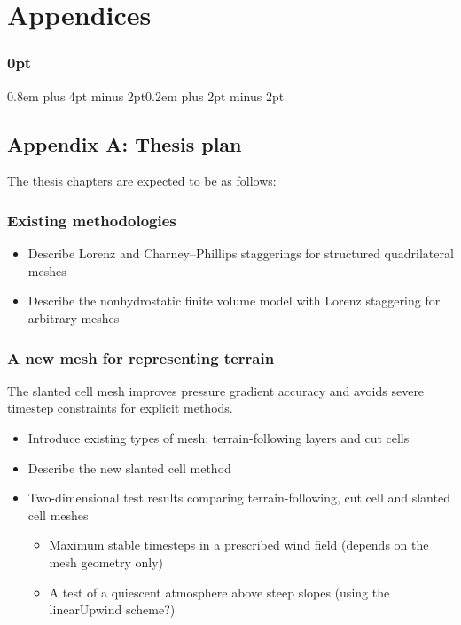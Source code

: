 \documentclass[a4paper,11pt]{article}
\begin{document}
                                                 


\newpage

\section*{Appendices}

\titlespacing\subsubsection{0pt}{0.8em plus 4pt minus 2pt}{0.2em plus 2pt minus 2pt}

\subsection*{Appendix A: Thesis plan}
The thesis chapters are expected to be as follows:

\subsubsection*{Existing methodologies}
\begin{itemize}[itemsep=0.1em]
	\item Describe Lorenz and Charney--Phillips staggerings for structured quadrilateral meshes
	\item Describe the nonhydrostatic finite volume model with Lorenz staggering for arbitrary meshes \citep{weller-shahrokhi2014}
\end{itemize}

\subsubsection*{A new mesh for representing terrain}
\noindent The slanted cell mesh improves pressure gradient accuracy and avoids severe timestep constraints for explicit methods.
\begin{itemize}[itemsep=0.1em]
	\item Introduce existing types of mesh: terrain-following layers and cut cells
	\item Describe the new slanted cell method
	\item {Two-dimensional test results comparing terrain-following, cut cell and slanted cell meshes
	\begin{itemize}[itemsep=0.1em,topsep=0pt]
		\item Maximum stable timesteps in a prescribed wind field (depends on the mesh geometry only)
		\item A test of a quiescent atmosphere above steep slopes (using the linearUpwind scheme?)
	\end{itemize}}
\end{itemize}
\end{document}
